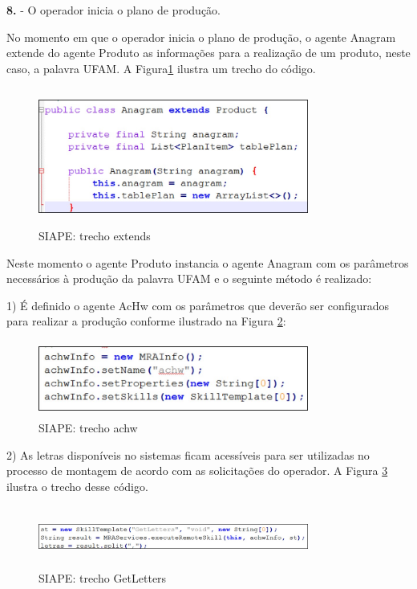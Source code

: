 \documentclass[10pt,letterpaper,twocolumn]{IEEEtran}
\begin{document}
	
	\textbf{8.} - O operador inicia o plano de produção.
	
	No momento em que o operador inicia o plano de produção, o agente Anagram extende do agente Produto as 
	informações para a realização de um produto, neste caso, a palavra UFAM. A Figura\ref{F147} ilustra um 
	trecho do código. 
	
	
	\begin{figure}[!h]
		\centering
		\includegraphics[width=8.9cm, height=4.5cm]{MeDSE_imagens/F147_extends.jpg} 
		\caption{SIAPE: trecho extends}
		\label{F147}
	\end{figure}
	
	Neste momento o agente Produto instancia o agente Anagram com os parâmetros necessários à produção da
	palavra UFAM e o seguinte método é realizado:
	
	1) É definido o agente AcHw com os parâmetros que deverão ser configurados para realizar a produção 
	conforme ilustrado na Figura \ref{F148}:
	
	\begin{figure}[!h]
		\centering
		\includegraphics[width=8.9cm, height=2.5cm]{MeDSE_imagens/F148_achw.jpg} 
		\caption{SIAPE: trecho achw}
		\label{F148}
	\end{figure}
	
	2) As letras disponíveis no sistemas ficam acessíveis para ser utilizadas no processo de montagem de 
	acordo com as solicitações do operador. A Figura \ref{F149} ilustra o trecho desse código.
	
	\begin{figure}[!h]
		\centering
		\includegraphics[width=8.9cm, height=2cm]{MeDSE_imagens/F149_letters.jpg} 
		\caption{SIAPE: trecho GetLetters}
		\label{F149}
	\end{figure}
	
\end{document}

